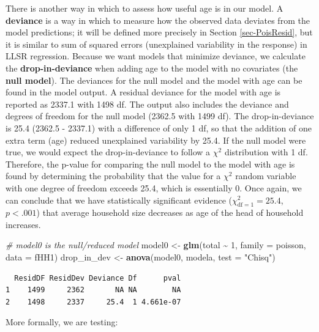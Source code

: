 \documentclass[
]{krantz}
\newenvironment{Shaded}{\begin{snugshade}}{\end{snugshade}}
\newcommand{\AttributeTok}[1]{\textcolor[rgb]{0.27,0.27,0.27}{#1}}
\newcommand{\CommentTok}[1]{\textcolor[rgb]{0.37,0.37,0.37}{\textit{#1}}}
\newcommand{\DecValTok}[1]{\textcolor[rgb]{0.06,0.06,0.06}{#1}}
\newcommand{\FunctionTok}[1]{\textcolor[rgb]{0.27,0.27,0.27}{\textbf{#1}}}
\newcommand{\NormalTok}[1]{#1}
\newcommand{\OtherTok}[1]{\textcolor[rgb]{0.37,0.37,0.37}{#1}}
\newcommand{\SpecialCharTok}[1]{\textcolor[rgb]{0.43,0.43,0.43}{\textbf{#1}}}
\newcommand{\StringTok}[1]{\textcolor[rgb]{0.5,0.5,0.5}{#1}}
\begin{document}
There is another way in which to assess how useful age is in our model. A \textbf{deviance}  is a way in which to measure how the observed data deviates from the model predictions; it will be defined more precisely in Section \ref{sec-PoisResid}, but it is similar to sum of squared errors (unexplained variability in the response) in LLSR regression. Because we want models that minimize deviance, we calculate the \textbf{drop-in-deviance}  when adding age to the model with no covariates (the \textbf{null model}).  The deviances for the null model and the model with age can be found in the model output. A residual deviance for the model with age is reported as 2337.1 with 1498 df. The output also includes the deviance and degrees of freedom for the null model (2362.5 with 1499 df). The drop-in-deviance is 25.4 (2362.5 - 2337.1) with a difference of only 1 df, so that the addition of one extra term (age) reduced unexplained variability by 25.4. If the null model were true, we would expect the drop-in-deviance to follow a \(\chi^2\) distribution with 1 df. Therefore, the p-value for comparing the null model to the model with age is found by determining the probability that the value for a \(\chi^2\) random variable with one degree of freedom exceeds 25.4, which is essentially 0. Once again, we can conclude that we have statistically significant evidence (\(\chi^2_{\text{df} =1}=25.4\), \(p < .001\)) that average household size decreases as age of the head of household increases.

\begin{Shaded}
\begin{Highlighting}[]
\CommentTok{\# model0 is the null/reduced model}
\NormalTok{model0 }\OtherTok{\textless{}{-}} \FunctionTok{glm}\NormalTok{(total }\SpecialCharTok{\textasciitilde{}} \DecValTok{1}\NormalTok{, }\AttributeTok{family =}\NormalTok{ poisson, }\AttributeTok{data =}\NormalTok{ fHH1)}
\NormalTok{drop\_in\_dev }\OtherTok{\textless{}{-}} \FunctionTok{anova}\NormalTok{(model0, modela, }\AttributeTok{test =} \StringTok{"Chisq"}\NormalTok{)}
\end{Highlighting}
\end{Shaded}

\begin{verbatim}
  ResidDF ResidDev Deviance Df      pval
1    1499     2362       NA NA        NA
2    1498     2337     25.4  1 4.661e-07
\end{verbatim}

More formally, we are testing:
\end{document}
